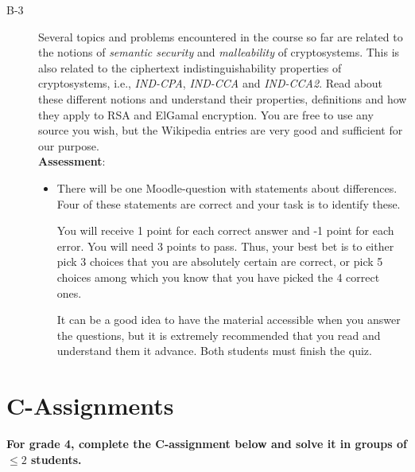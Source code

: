 \documentclass{article}
\begin{document}
\begin{description}
			\item[B-3]{Several topics and problems encountered in the course so far are related to the notions of \textit{semantic security} and \textit{malleability} of cryptosystems. This is also related to the ciphertext indistinguishability properties of cryptosystems, i.e., \textit{IND-CPA}, \textit{IND-CCA} and \textit{IND-CCA2}. Read about these different notions and understand their properties, definitions and how they apply to RSA and ElGamal encryption. You are free to use any source you wish, but the Wikipedia entries are very good and sufficient for our purpose.\\
				\textbf{Assessment}:
				\begin{itemize}
					\item There will be one Moodle-question with statements about differences. Four of these statements are correct and your task is to identify these.  
					
					You will receive 1 point for each correct answer and -1 point for each error. You will need 3 points to pass. Thus, your best bet is to either pick 3 choices that you are absolutely certain are correct, or pick 5 choices among which you know that you have picked the 4 correct ones.
					
					It can be a good idea to have the material accessible when you answer the questions, but it is extremely recommended that you read and understand them it advance. Both students must finish the quiz.
				\end{itemize}}
				
				
			\end{description}
		
			\clearpage

			\section*{C-Assignments}
			\textbf{For grade 4, complete the C-assignment below and solve it in groups of $\leq 2$ students.}
			
\end{document}
